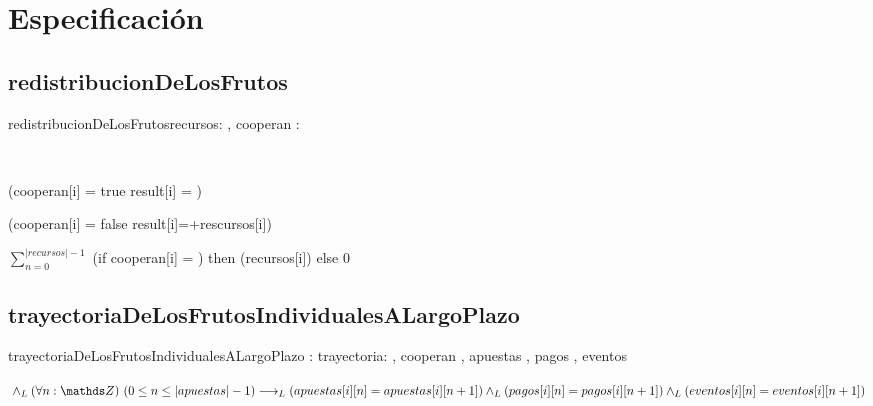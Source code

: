 \maketitle

\section{Especificación}
\subsection {redistribucionDeLosFrutos}

\begin{proc}{redistribucionDeLosFrutos}{\In recursos: \TLista{\float}, \In cooperan : \TLista{\float}}{\TLista{\float}}
\end{proc}

    {
    \implicaLuego \\
        {(cooperan[i] = true \implicaLuego result[i] = )     \land 

    } 

        (cooperan[i] = false \implicaLuego result[i]=+rescursos[i])
      }

$\sum_{n=0}^{|recursos|-1}$ (if cooperan[i] = \True) then (recursos[i]) else 0

\subsection {trayectoriaDeLosFrutosIndividualesALargoPlazo}

\begin{proc}{trayectoriaDeLosFrutosIndividualesALargoPlazo}
{\Inout: trayectoria: \TLista{\TLista{\float}}, \In cooperan , \In apuestas \TLista{\TLista{\float}}, \In pagos \TLista{\TLista{\float}}, \In eventos \TLista{\TLista{\float}}}
{\TLista{\TLista{\nat}}}

$\\ \yLuego \paraTodo[unalinea]{n}{\ent}{0 \leq n \leq |apuestas|-1}\implicaLuego ({apuestas[i][n]=apuestas[i][n+1]}) 
\\ \yLuego ({pagos[i][n]=pagos[i][n+1]}) 
\\ \yLuego ({eventos[i][n]=eventos[i][n+1]})
$
\end{proc}


